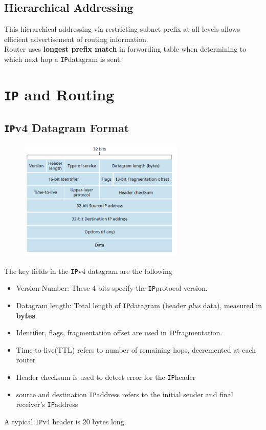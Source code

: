 \documentclass[12pt]{article}
\newcommand\IP{\texttt{IP}}
\theoremstyle{definition}
\begin{document}
\subsection{Hierarchical Addressing}
This hierarchical addressing via restricting subnet prefix at all levels allows efficient advertisement of routing information. \\Router uses \textbf{longest prefix match} in forwarding table when determining to which next hop a \IP datagram is sent.
\clearpage
\section{\IP{ and Routing}}
\subsection{\IP{v4} Datagram Format}
\begin{figure}[h]
\centering
\includegraphics[width = 0.7\textwidth]{6_1_1.png}
\end{figure}
The key fields in the \IP{v4} datagram are the following
\begin{itemize}
  \item Version Number: These 4 bits specify the \IP protocol version.
  \item Datagram length: Total length of \IP datagram (header \textit{plus} data), measured in \textbf{bytes}.
  \item Identifier, flags, fragmentation offset are used in \IP fragmentation.
  \item Time-to-live(TTL) refers to number of remaining hops, decremented at each router
  \item Header checksum is used to detect error for the \IP header
  \item source and destination \IP address refers to the initial sender and final receiver's \IP address
\end{itemize}
A typical \IP{v4} header is 20 bytes long.
\end{document}
